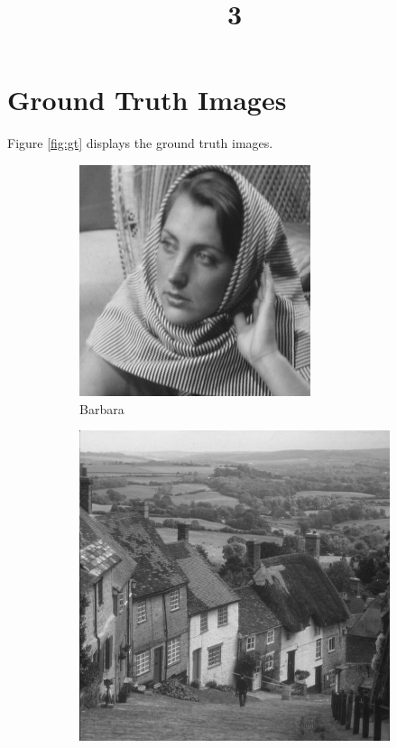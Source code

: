 \documentclass[a4paper]{article}
\title{3}
\date{}
\begin{document}
\maketitle
\section{Ground Truth Images}
Figure \ref{fig:gt} displays the ground truth images.
\begin{figure}[H]
    \centering
    \begin{subfigure}{0.24\linewidth}
        \centering
        \includegraphics[width = \linewidth]{barbara256.png}
        \caption{Barbara}
    \end{subfigure}
    \begin{subfigure}{0.24\linewidth}
        \centering
        \includegraphics[width = \linewidth]{goldhill.png}

\end{subfigure}
\end{figure}
\end{document}
